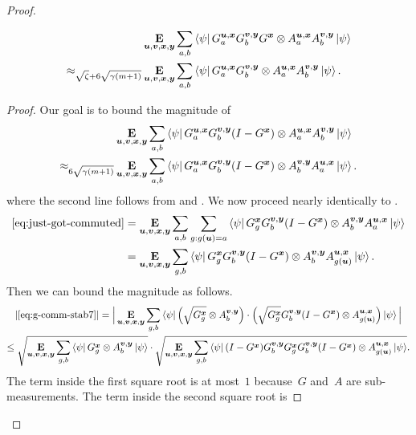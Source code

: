 \begin{proof}
\begin{claim}
\label{clm:g-comm-stability2}
\begin{align*}
	&\E_{\bu,\bv,\bx,\by} \sum_{a,b} \bra{\psi} G^{\bu,\bx}_a  G^{\bv,\by}_b G^{\bx}  \ot A^{\bu,\bx}_a A^{\bv,\by}_b  \ket{\psi}  \\
	\approx_{\sqrt{\zeta}+6\sqrt{\gamma(m+1)}}& \E_{\bu,\bv,\bx,\by} \sum_{a,b} \bra{\psi} G^{\bu,\bx}_a  G^{\bv,\by}_b \ot A^{\bu,\bx}_a A^{\bv,\by}_b  \ket{\psi}.
\end{align*}
\end{claim}
\begin{proof}
	Our goal is to bound the magnitude of
	\begin{align}
	&\E_{\bu,\bv,\bx,\by} \sum_{a,b} \bra{\psi} G^{\bu,\bx}_a  G^{\bv,\by}_b (I-G^{\bx})  \ot A^{\bu,\bx}_a A^{\bv,\by}_b  \ket{\psi}\nonumber\\
	\approx_{6\sqrt{\gamma(m+1)}} &\E_{\bu,\bv,\bx,\by} \sum_{a,b} \bra{\psi} G^{\bu,\bx}_a  G^{\bv,\by}_b (I-G^{\bx})  \ot  A^{\bv,\by}_b A^{\bu,\bx}_a \ket{\psi}.\label{eq:just-got-commuted}
	\end{align}
	where the second line follows from  and .
	We now proceed nearly identically to .
	\begin{align}
	\eqref{eq:just-got-commuted}
	&=\E_{\bu,\bv,\bx,\by} \sum_{a,b}\sum_{g:g(\bu)=a} \bra{\psi} G^{\bx}_g  G^{\bv,\by}_b (I-G^{\bx})  \ot A^{\bv,\by}_b A^{\bu,\bx}_a \ket{\psi} \nonumber\\
	&=\E_{\bu,\bv,\bx,\by} \sum_{g,b} \bra{\psi} G^{\bx}_g  G^{\bv,\by}_b (I-G^{\bx})  \ot A^{\bv,\by}_b A^{\bu,\bx}_{g(\bu)}   \ket{\psi}.\label{eq:g-comm-stab7}
	\end{align}
	Then we can bound the magnitude as follows.
	\begin{multline*}
	|\eqref{eq:g-comm-stab7}|
	= \Big|\E_{\bu,\bv,\bx,\by} \sum_{g,b} \bra{\psi} \Big(\sqrt{G^{\bx}_g}\otimes A^{\bv,\by}_b\Big) \cdot \Big(\sqrt{G^{\bx}_g}  G^{\bv,\by}_b (I-G^{\bx})  \ot  A^{\bu,\bx}_{g(\bu)}\Big)\ket{\psi} \Big|\\
	\leq \sqrt{\E_{\bu,\bv,\bx,\by} \sum_{g,b} \bra{\psi} G^{\bx}_g\otimes A^{\bv,\by}_b\ket{\psi}}
		\cdot \sqrt{\E_{\bu,\bv,\bx,\by} \sum_{g,b} \bra{\psi}(I-G^{\bx}) G^{\bv,\by}_b G^{\bx}_g  G^{\bv,\by}_b (I-G^{\bx})  \ot  A^{\bu,\bx}_{g(\bu)}\ket{\psi}}.
	\end{multline*}
	The term inside the first square root is at most~$1$ because~$G$ and~$A$ are sub-measurements.
	The term inside the second square root is

\end{proof}
\end{proof}
